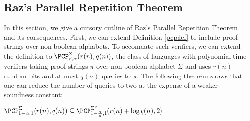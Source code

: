 \subsection{Raz's Parallel Repetition Theorem}
In this section, we give a cursory outline of Raz's Parallel Repetition Theorem and its consequences. First, we can extend Definition \ref{pcpdef} to include proof strings over non-boolean alphabets.
%
To accomdate such verifiers, we can extend the definition to $\PCP^\Sigma_{\beta, \alpha}(r(n),q(n))$, the class of languages with polynomial-time verifiers taking proof strings $\pi$ over non-boolean alphabet $\Sigma$ and uses $r(n)$ random bits and at most $q(n)$ queries to $\pi$.
%
The following theorem shows that one can reduce the number of queries to two at the expense of a weaker soundness constant:
%
\begin{theorem} \label{2queryinclusion}
  $\PCP^\Sigma_{1 - \alpha, 1}(r(n),q(n)) \subseteq \PCP^{\Sigma^q}_{1 - \frac{\alpha}{q},1}(r(n) + \log{q(n)}, 2)$
\end{theorem}
%
